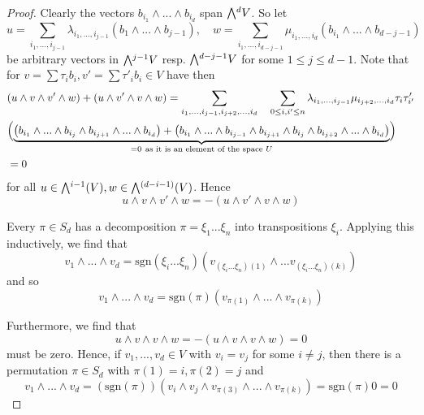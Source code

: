 \documentclass{scrartcl}
\newcommand{\sgn}{\mathrm{sgn}}
\newcommand{\extpow}{\mathchoice{{\textstyle\bigwedge}}
    {{\bigwedge}}
    {{\textstyle\wedge}}
    {{\scriptstyle\wedge}}}
\theoremstyle{definition}
\begin{document}
\begin{proof}
    Clearly the vectors $b_{i_1} \wedge ... \wedge b_{i_d}$ span $\extpow^d V$.
    So let
    \begin{equation*}
        u = \sum_{i_1, ..., i_{j - 1}} \lambda_{i_1, ..., i_{j - 1}} (b_1 \wedge ... \wedge b_{j - 1}), \quad w = \sum_{i_1, ..., i_{d - j - 1}} \mu_{i_1, ..., i_d} (b_{i_1} \wedge ... \wedge b_{d - j - 1})
    \end{equation*}
    be arbitrary vectors in $\extpow^{j - 1} V$ resp. $\extpow^{d - j - 1} V$ for some $1 \leq j \leq d - 1$.
    Note that for $v = \sum \tau_i b_i, v' = \sum \tau'_i b_i \in V$ have then
    \begin{align*}
        &(u \wedge v \wedge v' \wedge w) + (u \wedge v' \wedge v \wedge w) = \sum_{i_1, ..., i_{j - 1}, i_{j + 2}, ..., i_d} \quad \sum_{0 \leq i, i' \leq n} \lambda_{i_1, ..., i_{j - 1}} \mu_{i_{j + 2}, ..., i_d} \tau_i \tau'_{i'} \\
        &\Bigl(\underbrace{\bigl( b_{i_1} \wedge ... \wedge b_{i_j} \wedge b_{i_{j + 1}} \wedge ... \wedge b_{i_d}\bigr) + \bigl( b_{i_1} \wedge ... \wedge b_{i_{j - 1}} \wedge b_{i_{j + 1}} \wedge b_{i_j} \wedge b_{i_{j + 2}} \wedge ... \wedge b_{i_d} \bigr)}_{= 0 \ \text{as it is an element of the space $U$}} \Bigl) \\
        &= 0
    \end{align*}
    for all $u \in \extpow^{i - 1}(V), w \in \extpow^{(d - i - 1)}(V)$.
    Hence
    \begin{equation*}
        u \wedge v \wedge v' \wedge w = -(u \wedge v' \wedge v \wedge w)
    \end{equation*}

    Every $\pi \in S_d$ has a decomposition $\pi = \xi_1 ... \xi_n$ into transpositions $\xi_i$.
    Applying this inductively, we find that
    \begin{equation*}
        v_1 \wedge ... \wedge v_d = \sgn(\xi_i ... \xi_n) (v_{(\xi_i ... \xi_n)(1)} \wedge ... v_{(\xi_i ... \xi_n)(k)})
    \end{equation*}
    and so
    \begin{equation*}
        v_1 \wedge ... \wedge v_d = \sgn(\pi) (v_{\pi(1)} \wedge ... \wedge v_{\pi(k)})
    \end{equation*}

    Furthermore, we find that
    \begin{equation*}
        u \wedge v \wedge v \wedge w = -(u \wedge v \wedge v \wedge w) = 0
    \end{equation*}
    must be zero.
    Hence, if $v_1, ..., v_d \in V$ with $v_i = v_j$ for some $i \neq j$, then there is a permutation $\pi \in S_d$ with $\pi(1) = i, \pi(2) = j$ and
    \begin{equation*}
        v_1 \wedge ... \wedge v_d = (\sgn(\pi))(v_i \wedge v_j \wedge v_{\pi(3)} \wedge ... \wedge v_{\pi(k)}) = \sgn(\pi) 0 = 0
    \end{equation*}
\end{proof}
\end{document}
